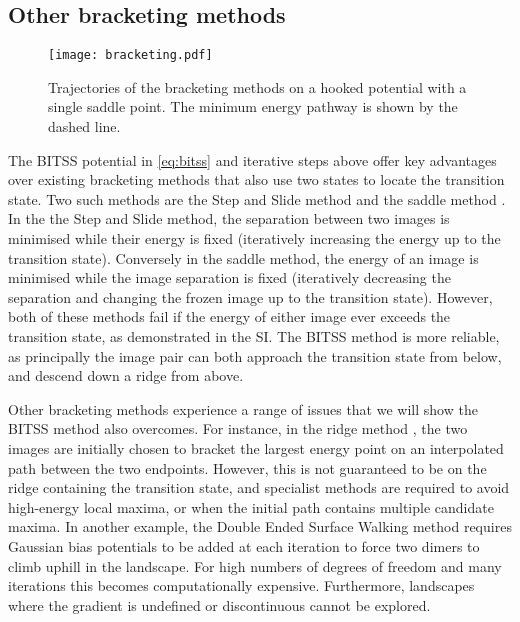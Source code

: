 \documentclass[twocolumn,10pt]{revtex4}
\begin{document}
\subsection{Other bracketing methods}
\begin{figure}[htb]
  \texttt{[image: bracketing.pdf]}
  \caption{\label{fig:bracketing}
    Trajectories of the bracketing methods on a hooked potential with a single saddle point.
    The minimum energy pathway is shown by the dashed line.
  }
\end{figure}
The BITSS potential in \cref{eq:bitss} and iterative steps above offer key advantages over existing bracketing methods that also use two states to locate the transition state.
Two such methods are the Step and Slide method \cite{Miron2001} and the saddle method \cite{Dewar1984}.
In the the Step and Slide method, the separation between two images is minimised while their energy is fixed (iteratively increasing the energy up to the transition state).
Conversely in the saddle method, the energy of an image is minimised while the image separation is fixed (iteratively decreasing the separation and changing the frozen image up to the transition state).
However, both of these methods fail if the energy of either image ever exceeds the transition state, as demonstrated in the SI.
The BITSS method is more reliable, as principally the image pair can both approach the transition state from below, and descend down a ridge from above.

Other bracketing methods experience a range of issues that we will show the BITSS method also overcomes.
For instance, in the ridge method \cite{Ionova1993}, the two images are initially chosen to bracket the largest energy point on an interpolated path between the two endpoints.
However, this is not guaranteed to be on the ridge containing the transition state, and specialist methods are required to avoid high-energy local maxima, or when the initial path contains multiple candidate maxima.
In another example, the Double Ended Surface Walking method \cite{Zhang2013} requires Gaussian bias potentials to be added at each iteration to force two dimers to climb uphill in the landscape.
For high numbers of degrees of freedom and many iterations this becomes computationally expensive.
Furthermore, landscapes where the gradient is undefined or discontinuous cannot be explored.
\end{document}
